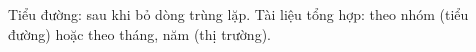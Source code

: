 Tiểu đường: sau khi bỏ dòng trùng lặp. Tài liệu tổng hợp: theo nhóm (tiểu đường) hoặc theo tháng, năm (thị trường).

